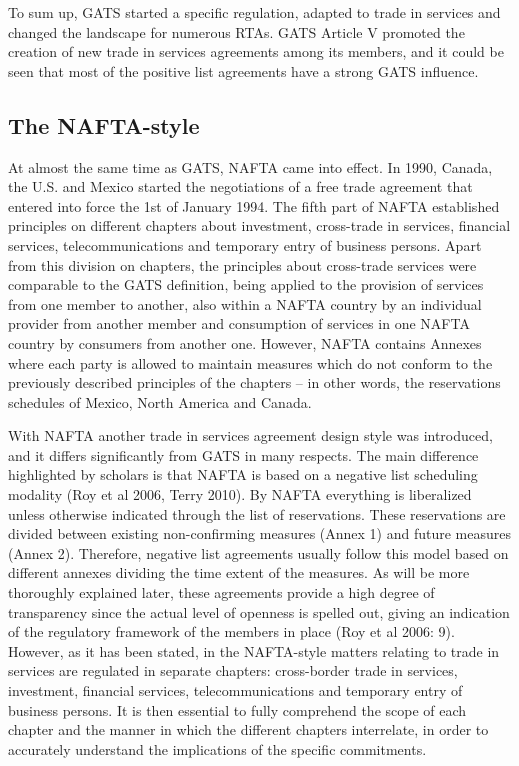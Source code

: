 \documentclass{article}
\begin{document}
\smallskip

To sum up, GATS started a specific regulation, adapted to trade in services and changed the landscape for numerous RTAs. GATS Article V promoted the creation of new trade in services agreements among its members, and it could be seen that most of the positive list agreements have a strong GATS influence.

\subsection{The NAFTA-style}

At almost the same time as GATS, NAFTA came into effect. In 1990, Canada, the U.S. and Mexico started the negotiations of a free trade agreement that entered into force the 1st of January 1994. The fifth part of NAFTA established principles on different chapters about investment, cross-trade in services, financial services, telecommunications and temporary entry of business persons. Apart from this division on chapters, the principles about cross-trade services were comparable to the GATS definition, being applied to the provision of services from one member to another, also within a NAFTA country by an individual provider from another member and consumption of services in one NAFTA country by consumers from another one. However, NAFTA contains Annexes where each party is allowed to maintain measures which do not conform to the previously described principles of the chapters -- in other words, the reservations schedules of Mexico, North America and Canada.

\smallskip

With NAFTA another trade in services agreement design style was introduced, and it differs significantly from GATS in many respects. The main difference highlighted by scholars is that NAFTA is based on a negative list scheduling modality (Roy et al 2006, Terry 2010). By NAFTA everything is liberalized unless otherwise indicated through the list of reservations. These reservations are divided between existing non-confirming measures (Annex 1) and future measures (Annex 2). Therefore, negative list agreements usually follow this model based on different annexes dividing the time extent of the measures. As will be more thoroughly explained later, these agreements provide a high degree of transparency since the actual level of openness is spelled out, giving an indication of the regulatory framework of the members in place (Roy et al 2006: 9). However, as it has been stated, in the NAFTA-style matters relating to trade in services are regulated in separate chapters: cross-border trade in services, investment, financial services, telecommunications and temporary entry of business persons. It is then essential to fully comprehend the scope of each chapter and the manner in which the different chapters interrelate, in order to accurately understand the implications of the specific commitments.
\end{document}
